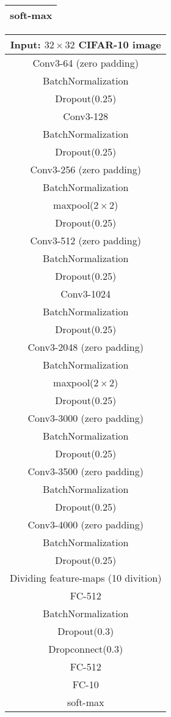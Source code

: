 \documentclass[a4j]{article}
\begin{document}
\begin{table}[t]
\begin{tabular}[t]{|c|}
      soft-max\\ \hline
    \end{tabular}
\begin{tabular}[t]{|c|} \hline
      Input: $32\times32$ CIFAR-10 image\\ \hline
      Conv3-64 (zero padding)\\
      BatchNormalization\\
      Dropout(0.25)\\
      Conv3-128\\
      BatchNormalization\\
      Dropout(0.25)\\
      Conv3-256 (zero padding)\\
      BatchNormalization\\ \hline
      maxpool($2\times2$)\\ \hline
      Dropout(0.25)\\
      Conv3-512 (zero padding)\\
      BatchNormalization\\
      Dropout(0.25)\\
      Conv3-1024\\
      BatchNormalization\\
      Dropout(0.25)\\
      Conv3-2048 (zero padding)\\
      BatchNormalization\\ \hline
      maxpool($2\times2$)\\ \hline
      Dropout(0.25)\\
      Conv3-3000 (zero padding)\\
      BatchNormalization\\
      Dropout(0.25)\\
      Conv3-3500 (zero padding)\\
      BatchNormalization\\
      Dropout(0.25)\\
      Conv3-4000 (zero padding)\\
      BatchNormalization\\
      Dropout(0.25)\\ \hline\hline
      Dividing feature-maps (10 divition)\\ \hline\hline
      FC-512\\
      BatchNormalization\\
      Dropout(0.3)\\ \hline
      Dropconnect(0.3)\\
      FC-512\\ \hline
      FC-10\\ \hline
      soft-max\\ \hline
    \end{tabular}
\end{table}
\end{document}
